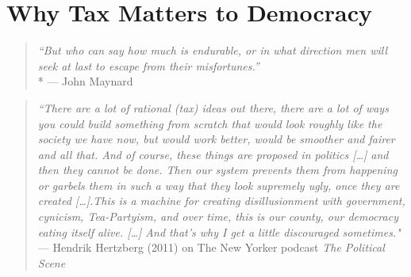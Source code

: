 
\section{Why Tax Matters to Democracy}

\begin{quote}
	\emph{``But who can say how much is endurable, or in what direction men will seek at last to escape from their misfortunes.''}\\*
	--- John Maynard \cite{Keynes1936}
\end{quote}


\begin{quote}
	\emph{``There are a lot of rational (tax) ideas out there, there are a lot of ways you could build something from scratch that would look roughly like the society we have now, but would work better, would be smoother and fairer and all that.
And of course, these things are proposed in politics [\ldots] and then they cannot be done.
Then our system prevents them from happening or garbels them in such a way that they look supremely ugly, once they are created [\ldots].This is a machine for creating disillusionment with government, cynicism, Tea-Partyism, and over time, this is our county, our democracy eating itself alive.
[\ldots] And that's why I get a little discouraged sometimes."}\\
	--- Hendrik Hertzberg (2011) on The New Yorker podcast \emph{The Political Scene}
\end{quote}


